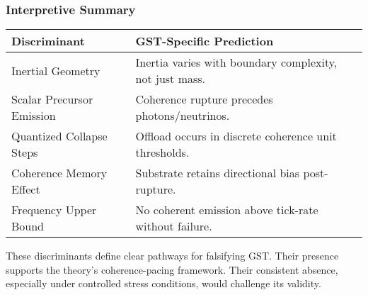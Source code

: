 \documentclass[entropy,article,submit,pdftex,moreauthors]{Definitions/mdpi}
\begin{document}
\subsubsection*{Interpretive Summary}

\renewcommand{\arraystretch}{1.3}
\begin{center}
\begin{tabular}{|p{4.2cm}|p{7.8cm}|}
\hline
\textbf{Discriminant} & \textbf{GST-Specific Prediction} \\
\hline
Inertial Geometry & Inertia varies with boundary complexity, not just mass. \\
\hline
Scalar Precursor Emission & Coherence rupture precedes photons/neutrinos. \\
\hline
Quantized Collapse Steps & Offload occurs in discrete coherence unit thresholds. \\
\hline
Coherence Memory Effect & Substrate retains directional bias post-rupture. \\
\hline
Frequency Upper Bound & No coherent emission above tick-rate without failure. \\
\hline
\end{tabular}
\end{center}

These discriminants define clear pathways for falsifying GST. Their presence supports the theory’s coherence-pacing framework. Their consistent absence, especially under controlled stress conditions, would challenge its validity.
\end{document}
